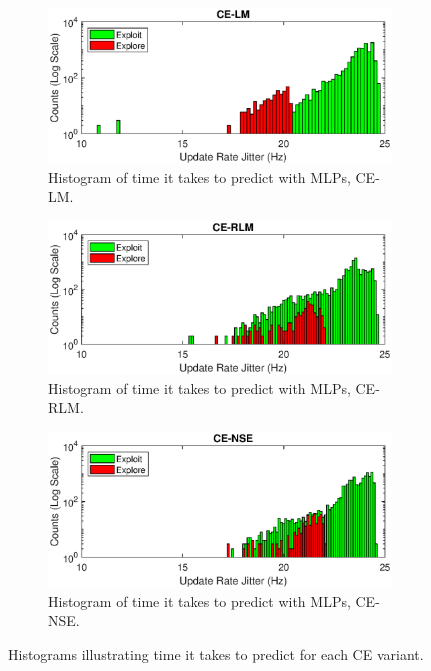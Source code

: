 \begin{figure}[ht]
\begin{subfigure}{\linewidth}
\centering
\includegraphics[scale=0.7]{figures/flight_results/coop_great_lm_updateRateJitter_log.eps}
\caption{Histogram of time it takes to predict with MLPs, CE-LM.}
\label{fig:flightCoopGreatLMExecTime}
\end{subfigure} 
\begin{subfigure}{\linewidth}
\centering
\includegraphics[scale=0.7]{figures/flight_results/coop_great_rlm_updateRateJitter_log.eps}
\caption{Histogram of time it takes to predict with MLPs, CE-RLM.}
\label{fig:flightCoopGreatLMExecTime}
\end{subfigure}
\begin{subfigure}{\linewidth}
\centering
\includegraphics[scale=0.7]{figures/flight_results/coop_great_nse_updateRateJitter_log.eps}
\caption{Histogram of time it takes to predict with MLPs, CE-NSE.}
\label{fig:flightCoopGreatNSEExecTime}
\end{subfigure}
\caption{Histograms illustrating time it takes to predict for each CE variant.}
\label{fig:histExecTimes}
\end{figure}

